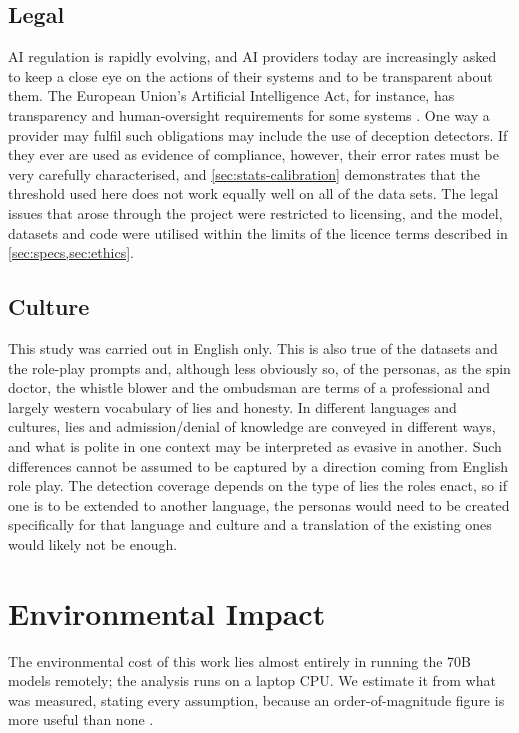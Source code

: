 \subsection{Legal}

AI regulation is rapidly evolving, and AI providers today are increasingly asked to keep a close
eye on the actions of their systems and to be transparent about them. The European Union's
Artificial Intelligence Act, for instance, has transparency and human-oversight requirements for
some systems \cite{euaiact2024}. One way a provider may fulfil such obligations may include the use of
deception detectors. If they ever are used as evidence of compliance, however, their error rates
must be very carefully characterised, and \cref{sec:stats-calibration} demonstrates that the threshold used
here does not work equally well on all of the data sets. The legal issues that arose through the
project were restricted to licensing, and the model, datasets and code were utilised within the
limits of the licence terms described in \cref{sec:specs,sec:ethics}.

\subsection{Culture}

This study was carried out in English only. This is also true of the datasets and the role-play
prompts and, although less obviously so, of the personas, as the spin doctor, the whistle blower
and the ombudsman are terms of a professional and largely western vocabulary of lies and
honesty. In different languages and cultures, lies and admission/denial of knowledge are
conveyed in different ways, and what is polite in one context may be interpreted as evasive in
another. Such differences cannot be assumed to be captured by a direction coming from English
role play. The detection coverage depends on the type of lies the roles enact, so if one is to be
extended to another language, the personas would need to be created specifically for that
language and culture and a translation of the existing ones would likely not be enough.

\section{Environmental Impact}
\label{sec:environment}

The environmental cost of this work lies almost entirely in running the 70B models remotely; the
analysis runs on a laptop CPU. We estimate it from what was measured, stating every assumption,
because an order-of-magnitude figure is more useful than none \cite{strubell2019energy,patterson2021carbon}.

